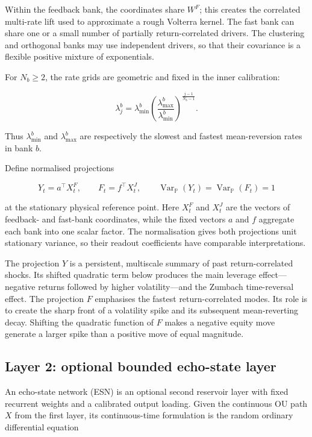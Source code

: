 \documentclass[11pt,a4paper]{article}
\newcommand{\Pp}{\mathbb{P}}
\newcommand{\Var}{\operatorname{Var}}
\begin{document}
Within the feedback bank, the coordinates share \(W^F\); this creates the correlated
multi-rate lift used to approximate a rough Volterra kernel. The fast bank can share one or a
small number of partially return-correlated drivers. The clustering and orthogonal banks may
use independent drivers, so that their covariance is a flexible positive mixture of
exponentials.

For \(N_b\geq2\), the rate grids are geometric and fixed in the inner calibration:

\begin{equation}
\lambda_j^b
=\lambda_{\min}^b
\left(\frac{\lambda_{\max}^b}{\lambda_{\min}^b}\right)^{\frac{j-1}{N_b-1}}.
\end{equation}

Thus \(\lambda_{\min}^b\) and \(\lambda_{\max}^b\) are respectively the slowest and fastest
mean-reversion rates in bank \(b\).

Define normalised projections

\begin{equation}
Y_t=a^\top X_t^F,\qquad
F_t=f^\top X_t^J,\qquad
\Var_{\Pp}(Y_t)=\Var_{\Pp}(F_t)=1
\label{eq:projections}
\end{equation}

at the stationary physical reference point. Here \(X_t^F\) and \(X_t^J\) are the vectors of
feedback- and fast-bank coordinates, while the fixed vectors \(a\) and \(f\) aggregate each
bank into one scalar factor. The normalisation gives both projections unit stationary variance,
so their readout coefficients have comparable interpretations.

The projection \(Y\) is a persistent, multiscale summary of past return-correlated shocks. Its
shifted quadratic term below produces the main leverage effect---negative returns followed by
higher volatility---and the Zumbach time-reversal effect. The projection \(F\) emphasises the
fastest return-correlated modes. Its role is to create the sharp front of a volatility spike and
its subsequent mean-reverting decay. Shifting the quadratic function of \(F\) makes a negative
equity move generate a larger spike than a positive move of equal magnitude.

\subsection{Layer 2: optional bounded echo-state layer}

An echo-state network (ESN) is an optional second reservoir layer with fixed recurrent weights
and a calibrated output loading. Given the continuous OU path \(X\) from the first layer, its
continuous-time formulation is the random ordinary differential equation
\end{document}
